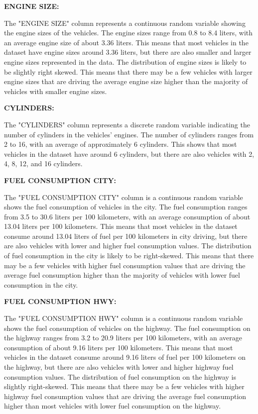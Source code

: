 \documentclass[12pt, a4paper,oneside]{book}
\numberwithin{equation}{section}
\begin{document}
\hfill \break


\textbf{ENGINE SIZE:}

The "ENGINE SIZE" column represents a continuous random variable showing the engine sizes of the vehicles. The engine sizes range from 0.8 to 8.4 liters, with an average engine size of about 3.36 liters. This means that most vehicles in the dataset have engine sizes around 3.36 liters, but there are also smaller and larger engine sizes represented in the data.
The distribution of engine sizes is likely to be slightly right skewed. This means that there may be a few vehicles with larger engine sizes that are driving the average engine size higher than the majority of vehicles with smaller engine sizes.

\hfill \break
\textbf{CYLINDERS:}

The "CYLINDERS" column represents a discrete random variable indicating the number of cylinders in the vehicles' engines. The number of cylinders ranges from 2 to 16, with an average of approximately 6 cylinders. This shows that most vehicles in the dataset have around 6 cylinders, but there are also vehicles with 2, 4, 8, 12, and 16 cylinders.

\hfill \break
\textbf{FUEL CONSUMPTION CITY:}

The "FUEL CONSUMPTION CITY" column is a continuous random variable shows the fuel consumption of vehicles in the city. The fuel consumption ranges from 3.5 to 30.6 liters per 100 kilometers, with an average consumption of about 13.04 liters per 100 kilometers. This means that most vehicles in the dataset consume around 13.04 liters of fuel per 100 kilometers in city driving, but there are also vehicles with lower and higher fuel consumption values.
The distribution of fuel consumption in the city is likely to be right-skewed. This means that there may be a few vehicles with higher fuel consumption values that are driving the average fuel consumption higher than the majority of vehicles with lower fuel consumption in the city.

\hfill \break
\textbf{FUEL CONSUMPTION HWY:}

The "FUEL CONSUMPTION HWY" column is a continuous random variable shows the fuel consumption of vehicles on the highway. The fuel consumption on the highway ranges from 3.2 to 20.9 liters per 100 kilometers, with an average consumption of about 9.16 liters per 100 kilometers. This means that most vehicles in the dataset consume around 9.16 liters of fuel per 100 kilometers on the highway, but there are also vehicles with lower and higher highway fuel consumption values.
The distribution of fuel consumption on the highway is slightly right-skewed. This means that there may be a few vehicles with higher highway fuel consumption values that are driving the average fuel consumption higher than most vehicles with lower fuel consumption on the highway.
\end{document}
